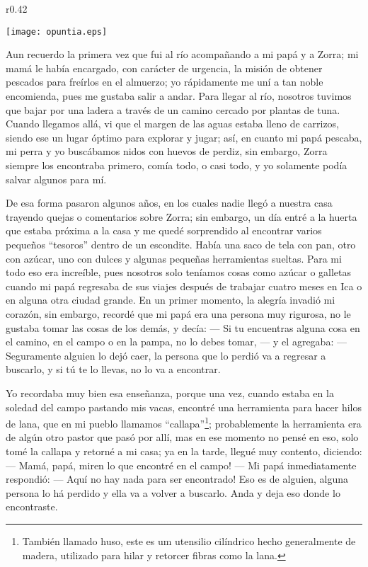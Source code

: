 \ifdefined\EnableIncludeImages
\begin{wrapfigure}{r}{0.42\textwidth}
  \begin{center}
  \vspace{-30pt}
    \texttt{[image: opuntia.eps]}
  \end{center}
  \vspace{-20pt}
\end{wrapfigure}
\fi
Aun recuerdo la primera vez que fui al río acompañando a mi papá y a Zorra; mi mamá le había encargado, con carácter de urgencia, la misión de obtener pescados para freírlos en el almuerzo; yo rápidamente me uní a tan noble encomienda, pues me gustaba salir a andar.
Para llegar al río, nosotros tuvimos que bajar por una ladera a través de un camino cercado por plantas de tuna. Cuando llegamos allá, vi que el margen de las aguas estaba lleno de carrizos, siendo ese un lugar óptimo para explorar y jugar; así, en cuanto mi papá pescaba, mi perra y yo buscábamos nidos con huevos de perdiz, sin embargo, Zorra siempre los encontraba primero, comía todo, o casi todo, y yo solamente podía salvar algunos para mí. 

De esa forma pasaron algunos años, en los cuales nadie llegó a nuestra casa trayendo quejas o comentarios sobre Zorra; sin embargo, un día entré a la huerta que estaba próxima a la casa y me quedé sorprendido al encontrar varios pequeños ``tesoros'' dentro de un escondite. Había una saco de tela con pan, otro con azúcar, uno con dulces y algunas pequeñas herramientas sueltas.
Para mi todo eso era increíble, pues nosotros solo teníamos cosas como azúcar o galletas cuando mi papá regresaba de sus viajes después de trabajar cuatro meses en Ica o en alguna otra ciudad grande. 
En un primer momento, la alegría invadió mi corazón, sin embargo, recordé que mi papá era una persona muy rigurosa, no le gustaba tomar las cosas de los demás, y decía: 
--- Si tu encuentras alguna cosa en el camino, en el campo o en la pampa, no lo debes tomar, --- 
y el agregaba: 
--- Seguramente alguien lo dejó caer, la persona que lo perdió va a regresar a buscarlo, y si tú te lo llevas, no lo va a encontrar.

Yo recordaba muy bien esa enseñanza, porque una vez, cuando estaba en la soledad del campo pastando mis vacas, encontré una herramienta para hacer hilos de lana, que en mi pueblo llamamos ``callapa''\footnote{También llamado huso, este es um utensilio cilíndrico hecho generalmente de madera, utilizado para hilar y retorcer fibras como la lana.}; probablemente la herramienta era de algún otro pastor que pasó por allí, mas en ese momento no pensé en eso, solo tomé la callapa y retorné a mi casa; ya en la tarde, llegué muy contento, diciendo: 
--- Mamá, papá, miren lo que encontré en el campo! ---
Mi papá inmediatamente respondió:  
--- Aquí no hay nada para ser encontrado! Eso es de alguien, alguna persona lo há perdido y ella va a volver a buscarlo. Anda y deja eso donde lo encontraste.

